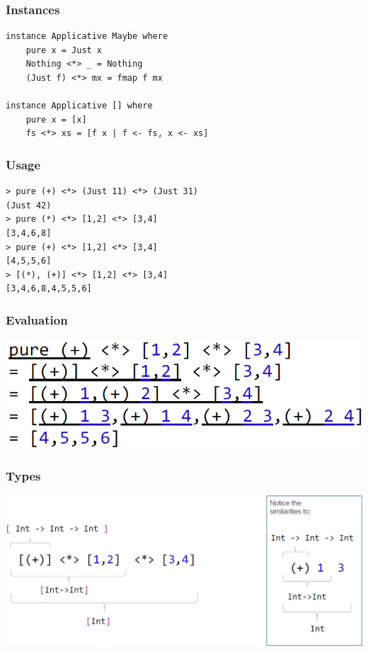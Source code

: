 \subsubsection{Instances}
\begin{lstlisting}
instance Applicative Maybe where 
    pure x = Just x
    Nothing <*> _ = Nothing
    (Just f) <*> mx = fmap f mx

instance Applicative [] where 
    pure x = [x]
    fs <*> xs = [f x | f <- fs, x <- xs]
\end{lstlisting}

\subsubsection{Usage}
\begin{lstlisting}
> pure (+) <*> (Just 11) <*> (Just 31)
(Just 42)
> pure (*) <*> [1,2] <*> [3,4]
[3,4,6,8]
> pure (+) <*> [1,2] <*> [3,4]
[4,5,5,6]
> [(*), (+)] <*> [1,2] <*> [3,4]
[3,4,6,8,4,5,5,6]
\end{lstlisting}

\subsubsection{Evaluation}
\includegraphics[width=0.6\linewidth]{img/applicative_functors_eval.png}

\subsubsection{Types}
\includegraphics[width=\linewidth]{img/applicative_functors_types.png}

